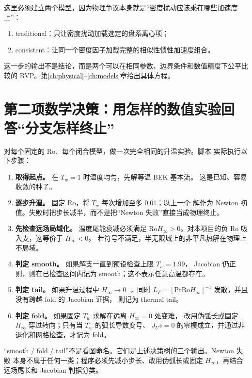 \documentclass[UTF8,zihao=-4,openany]{ctexbook}
\newcommand{\Ro}{\mathrm{Ro}}
\newcommand{\Pran}{\mathrm{Pr}}
\begin{document}
这里必须建立两个模型，因为物理争议本身就是“密度扰动应该乘在哪些加速度上”：
\begin{enumerate}
  \item traditional：只让密度扰动加载选定的盘系离心项；
  \item consistent：让同一个密度因子加载完整的相似性惯性加速度组合。
\end{enumerate}
这一步的输出不是结论，而是两个可以在相同参数、边界条件和数值精度下公平比较的
BVP。第\ref{ch:physical}--\ref{ch:models}章给出具体方程。

\section{第二项数学决策：用怎样的数值实验回答“分支怎样终止”}

对每个固定的 $\Ro$、每个闭合模型，做一次完全相同的升温实验。脚本
实际执行以下步骤：

\begin{enumerate}
  \item \textbf{取得起点。} 在 $T_w=1$ 时温度均匀，先解等温 BEK 基本流。
  这是已知、容易收敛的种子。
  \item \textbf{逐步升温。} 固定 $\Ro$，将 $T_w$ 每次增加至多 $0.01$；以上一个
  解作为 Newton 初值。失败时把步长减半，而不是把“Newton 失败”直接当成物理终止。
  \item \textbf{先检查远场局域化。} 温度尾能衰减必须满足
  $\Ro H_\infty>0$。对本项目的负 $\Ro$ 吸入支，这等价于 $H_\infty<0$。
  若符号不满足，半无限域上的非平凡热解在物理上不局域。
  \item \textbf{判定 smooth。} 如果解支一直到预设检查上限 $T_w=1.99$，
  Jacobian 仍正则，则在已检查区间内记为 smooth；这不表示任意高温都存在。
  \item \textbf{判定 tail。} 如果升温过程中 $H_\infty\to0^-$，同时
  $L_T=[\Pran\Ro H_\infty]^{-1}$ 发散，并且没有跨越 fold 的 Jacobian 证据，
  则记为 thermal tail。
  \item \textbf{判定 fold。} 如果固定 $T_w$ 求解在远离 $H_\infty=0$ 处变难，
  改用伪弧长或固定 $H_\infty$ 穿过转向；只有当 $T_w$ 的弧长导数变号、
  $J_Uv=0$ 的零模成立，并通过非退化和网格检查，才记为 fold。
\end{enumerate}

\begin{warningbox}[：5.4 表格中的每一个词怎样得到]
“smooth / fold / tail”不是看图命名。它们是上述决策树的三个输出。Newton 失败
本身不属于任何一类；程序必须先减小步长、改用伪弧长或固定 $H_\infty$，再结合
远场尾长和 Jacobian 判据分类。
\end{warningbox}
\end{document}
